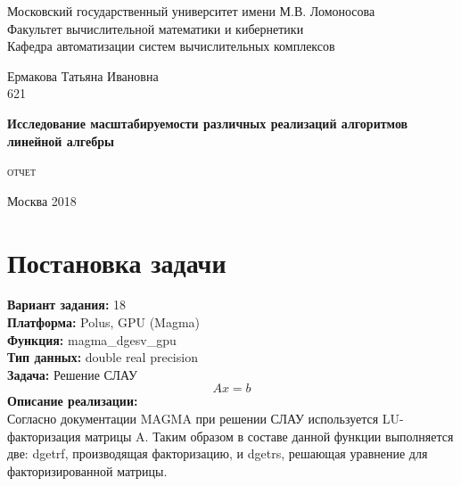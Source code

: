 \documentclass[12pt]{article}
\begin{document}
\sloppy

	\begin{titlepage}
		\newpage
		
		\begin{center}
			Московский государственный университет имени М.В. Ломоносова \\
			Факультет вычислительной математики и кибернетики \\
			Кафедра автоматизации систем вычислительных комплексов \\
		\end{center}
		
		\vspace{6em}
		
		\begin{center}
			\large
			Ермакова Татьяна Ивановна \\
			621
		\end{center}
		
		\begin{center}
			\Large
			\bfseries
			Исследование масштабируемости различных реализаций алгоритмов линейной алгебры
		\end{center}
		
		\vspace{0.3em}
		
		\begin{center}
			\large
			\textsc{
				отчет
			}
		\end{center}
		
		\vspace{\fill}
		
		\begin{center}
			Москва 2018
		\end{center}
		
	\end{titlepage}


	\section{Постановка задачи}
	\textbf{Вариант задания:} 18 \\
	\textbf{Платформа:} Polus, GPU (Magma) \\
	\textbf{Функция:} magma\_dgesv\_gpu \\
	\textbf{Тип данных:} double real precision \\
	\textbf{Задача:} Решение СЛАУ \\
	\begin{equation*}
	Ax=b
	\end{equation*}
	\textbf{Описание реализации:} \\
	Согласно документации MAGMA при решении СЛАУ используется LU-факторизация матрицы A. Таким образом в составе данной функции выполняется две: dgetrf, производящая факторизацию, и dgetrs, решающая уравнение для факторизированной матрицы.
	
\end{document}
